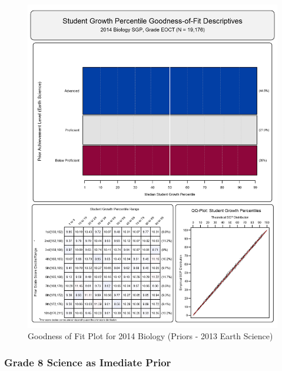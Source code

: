\documentclass[12pt]{article}
\begin{document}
\begin{figure}[htbp]
\centering
\includegraphics{../img/Goodness_of_Fit/BIOLOGY.2014/2014_BIOLOGY_EOCT;2013_EARTH_SCIENCE_EOCT.png}
\caption{Goodness of Fit Plot for 2014 Biology (Priors - 2013 Earth
Science)}
\end{figure}

\clearpage 

\subsubsection{Grade 8 Science as Imediate
Prior}\label{grade-8-science-as-imediate-prior}
\end{document}
